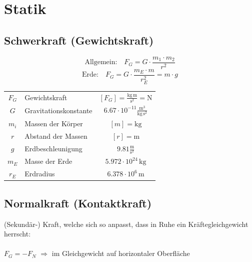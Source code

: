 \section{Statik}
		
	\subsection{Schwerkraft (Gewichtskraft)}
	
		$$ \boxed{ \text{Allgemein:} \quad F_G = G \cdot \frac{m_1 \cdot m_2}{r^2} }$$
		$$ \boxed{ \text{Erde:} \quad  F_G = G \cdot \frac{m_E \cdot m}{r_E^2} = m \cdot g }$$ 
		
		\begin{tabular}{clc}
			$F_G$ & Gewichtskraft         & $[F_G] = \mathrm{\frac{kg \, m}{s^2} = N}$ \\
			$G$   & Gravitationskonstante & $6.67 \cdot 10^{-11} \mathrm{\frac{m^3}{kg \, s^2}}$ \\ 
			$m_i$ & Massen der Körper     & $[m] = \mathrm{kg}$ \\
			$r$   & Abstand der Massen    & $[r] =\mathrm{m}$ \\
			$g$   & Erdbeschleunigung     & $9.81 \mathrm{\frac{m}{s^2}}$ \\
			$m_E$ & Masse der Erde        & $5.972 \cdot 10^{24} \, \mathrm{kg} $ \\
			$r_E$ & Erdradius             & $6.378 \cdot 10^6 \, \mathrm{m}$ \\
		\end{tabular}
		
	\subsection{Normalkraft (Kontaktkraft)}
		(Sekundär-) Kraft, welche sich so anpasst, dass in Ruhe ein Kräftegleichgewicht herrscht: \\
		\\
		$\boxed{ F_G = -F_N}$ \qquad $\Rightarrow$ im Gleichgewicht auf horizontaler Oberfläche
				
